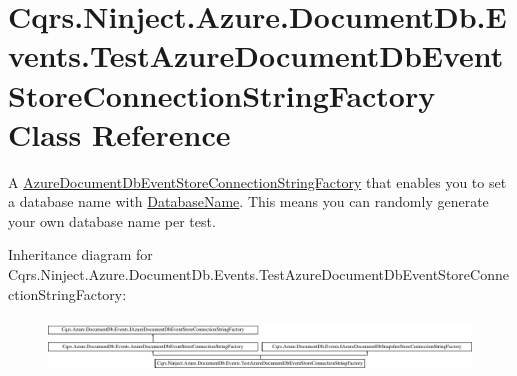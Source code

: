 \hypertarget{classCqrs_1_1Ninject_1_1Azure_1_1DocumentDb_1_1Events_1_1TestAzureDocumentDbEventStoreConnectionStringFactory}{}\section{Cqrs.\+Ninject.\+Azure.\+Document\+Db.\+Events.\+Test\+Azure\+Document\+Db\+Event\+Store\+Connection\+String\+Factory Class Reference}
\label{classCqrs_1_1Ninject_1_1Azure_1_1DocumentDb_1_1Events_1_1TestAzureDocumentDbEventStoreConnectionStringFactory}


A \hyperlink{classCqrs_1_1Azure_1_1DocumentDb_1_1Events_1_1AzureDocumentDbEventStoreConnectionStringFactory_a7503e00bedc6af5686ded0b6b7719a30_a7503e00bedc6af5686ded0b6b7719a30}{Azure\+Document\+Db\+Event\+Store\+Connection\+String\+Factory} that enables you to set a database name with \hyperlink{classCqrs_1_1Ninject_1_1Azure_1_1DocumentDb_1_1Events_1_1TestAzureDocumentDbEventStoreConnectionStringFactory_ad82e2485313ff7802ad125958173f3bf_ad82e2485313ff7802ad125958173f3bf}{Database\+Name}. This means you can randomly generate your own database name per test.  


Inheritance diagram for Cqrs.\+Ninject.\+Azure.\+Document\+Db.\+Events.\+Test\+Azure\+Document\+Db\+Event\+Store\+Connection\+String\+Factory\+:\begin{figure}[H]
\begin{center}
\leavevmode
\includegraphics[height=1.445783cm]{classCqrs_1_1Ninject_1_1Azure_1_1DocumentDb_1_1Events_1_1TestAzureDocumentDbEventStoreConnectionStringFactory}
\end{center}
\end{figure}

